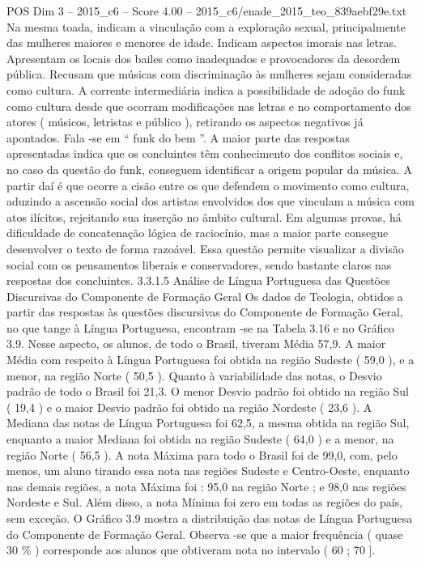 \begin{textsample}{POS Dim 3 – 2015\_c6 – Score 4.00 – 2015\_c6/enade\_2015\_teo\_839aebf29e.txt}
Na mesma toada, indicam a vinculação com a exploração sexual, principalmente das mulheres maiores e menores de idade.
Indicam aspectos imorais nas letras.
Apresentam os locais dos bailes como inadequados e provocadores da desordem pública.
Recusam que músicas com discriminação às mulheres sejam consideradas como cultura.
A corrente intermediária indica a possibilidade de adoção do funk como cultura desde que ocorram modificações nas letras e no comportamento dos atores ( músicos, letristas e público ), retirando os aspectos negativos já apontados.
Fala -se em “ funk do bem ”.
A maior parte das respostas apresentadas indica que os concluintes têm conhecimento dos conflitos sociais e, no caso da questão do funk, conseguem identificar a origem popular da música.
A partir daí é que ocorre a cisão entre os que defendem o movimento como cultura, aduzindo a ascensão social dos artistas envolvidos dos que vinculam a música com atos ilícitos, rejeitando sua inserção no âmbito cultural.
Em algumas provas, há dificuldade de concatenação lógica de raciocínio, mas a maior parte consegue desenvolver o texto de forma razoável.
Essa questão permite visualizar a divisão social com os pensamentos liberais e conservadores, sendo bastante claros nas respostas dos concluintes. 3.3.1.5 Análise de Língua Portuguesa das Questões Discursivas do Componente de Formação Geral Os dados de Teologia, obtidos a partir das respostas às questões discursivas do Componente de Formação Geral, no que tange à Língua Portuguesa, encontram -se na Tabela 3.16 e no Gráfico 3.9.
Nesse aspecto, os alunos, de todo o Brasil, tiveram Média 57,9.
A maior Média com respeito à Língua Portuguesa foi obtida na região Sudeste ( 59,0 ), e a menor, na região Norte ( 50,5 ).
Quanto à variabilidade das notas, o Desvio padrão de todo o Brasil foi 21,3.
O menor Desvio padrão foi obtido na região Sul ( 19,4 ) e o maior Desvio padrão foi obtido na região Nordeste ( 23,6 ).
A Mediana das notas de Língua Portuguesa foi 62,5, a mesma obtida na região Sul, enquanto a maior Mediana foi obtida na região Sudeste ( 64,0 ) e a menor, na região Norte ( 56,5 ).
A nota Máxima para todo o Brasil foi de 99,0, com, pelo menos, um aluno tirando essa nota nas regiões Sudeste e Centro-Oeste, enquanto nas demais regiões, a nota Máxima foi : 95,0 na região Norte ; e 98,0 nas regiões Nordeste e Sul.
Além disso, a nota Mínima foi zero em todas as regiões do país, sem exceção.
O Gráfico 3.9 mostra a distribuição das notas de Língua Portuguesa do Componente de Formação Geral.
Observa -se que a maior frequência ( quase 30 \% ) corresponde aos alunos que obtiveram nota no intervalo ( 60 ; 70 ].

\end{textsample}
